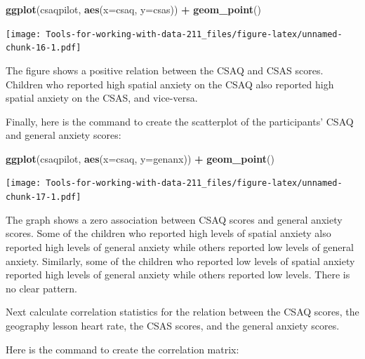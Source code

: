 \documentclass[
]{book}
\newenvironment{Shaded}{\begin{snugshade}}{\end{snugshade}}
\newcommand{\DataTypeTok}[1]{\textcolor[rgb]{0.13,0.29,0.53}{#1}}
\newcommand{\KeywordTok}[1]{\textcolor[rgb]{0.13,0.29,0.53}{\textbf{#1}}}
\newcommand{\NormalTok}[1]{#1}
\newcommand{\OperatorTok}[1]{\textcolor[rgb]{0.81,0.36,0.00}{\textbf{#1}}}
\newcommand{\OtherTok}[1]{\textcolor[rgb]{0.56,0.35,0.01}{#1}}
\newcommand{\StringTok}[1]{\textcolor[rgb]{0.31,0.60,0.02}{#1}}
\begin{document}
\begin{Shaded}
\begin{Highlighting}[]
\KeywordTok{ggplot}\NormalTok{(csaqpilot, }\KeywordTok{aes}\NormalTok{(}\DataTypeTok{x=}\NormalTok{csaq, }\DataTypeTok{y=}\NormalTok{csas)) }\OperatorTok{+}
\StringTok{  }\KeywordTok{geom_point}\NormalTok{()}
\end{Highlighting}
\end{Shaded}

\texttt{[image: Tools-for-working-with-data-211\_files/figure-latex/unnamed-chunk-16-1.pdf]}

The figure shows a positive relation between the CSAQ and CSAS scores. Children who reported high spatial anxiety on the CSAQ also reported high spatial anxiety on the CSAS, and vice-versa.

Finally, here is the command to create the scatterplot of the participants' CSAQ and general anxiety scores:

\begin{Shaded}
\begin{Highlighting}[]
\KeywordTok{ggplot}\NormalTok{(csaqpilot, }\KeywordTok{aes}\NormalTok{(}\DataTypeTok{x=}\NormalTok{csaq, }\DataTypeTok{y=}\NormalTok{genanx)) }\OperatorTok{+}
\StringTok{  }\KeywordTok{geom_point}\NormalTok{()}
\end{Highlighting}
\end{Shaded}

\texttt{[image: Tools-for-working-with-data-211\_files/figure-latex/unnamed-chunk-17-1.pdf]}

The graph shows a zero association between CSAQ scores and general anxiety scores. Some of the children who reported high levels of spatial anxiety also reported high levels of general anxiety while others reported low levels of general anxiety. Similarly, some of the children who reported low levels of spatial anxiety reported high levels of general anxiety while others reported low levels. There is no clear pattern.

Next calculate correlation statistics for the relation between the CSAQ scores, the geography lesson heart rate, the CSAS scores, and the general anxiety scores.

Here is the command to create the correlation matrix:

\begin{Shaded}
\end{Shaded}
\end{document}
